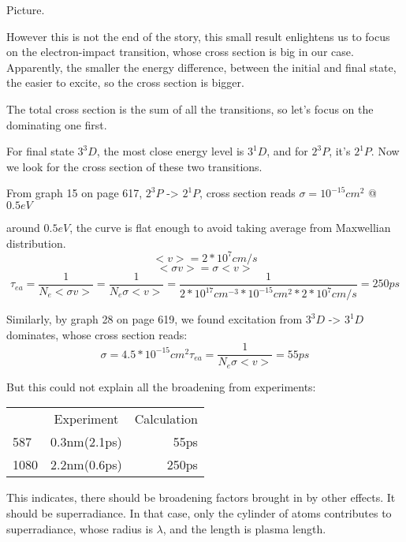 Picture.

However this is not the end of the story, this small result enlightens
us to focus on the electron-impact transition, whose cross section is
big in our case. Apparently, the smaller the energy difference,
between the initial and final state, the easier to excite, so the
cross section is bigger.

The total cross section is the sum of all the transitions, so let's
focus on the dominating one first.

For final state $3^3D$, the most close energy level is $3^1D$, and for
$2^3P$, it's $2^1P$. Now we look for the cross section of these two
transitions.

From graph 15 on page 617, $2^3P$ -> $2^1P$, cross section reads
$\sigma = 10^{-15}cm^2$ @ $0.5eV$

around $0.5eV$, the curve is flat enough to avoid taking average from
Maxwellian distribution.
\begin{equation*}
<v> = 2*10^7 cm/s
\end{equation*}
\begin{equation*}
<\sigma v> = \sigma <v>
\end{equation*}
\begin{equation}
\tau_{ea} = \frac{1}{N_e<\sigma v>} = \frac{1}{N_e \sigma <v>}
=\frac{1}{2*10^{17}cm^{-3}*10^{-15}cm^2*2*10^7cm/s} = 250 ps
\end{equation}

Similarly, by graph 28 on page 619, we found excitation from $3^3D$ ->
$3^1D$ dominates, whose cross section reads:
\begin{equation}
\sigma = 4.5 * 10^{-15} cm^2
\tau_{ea} = \frac{1}{N_e\sigma<v>} = 55ps
\end{equation}

But this could not explain all the broadening from experiments:

\begin{tabular}{ l c r }
       & Experiment & Calculation \\
  587  & 0.3nm(2.1ps) & 55ps \\
  1080 & 2.2nm(0.6ps) & 250ps \\
\end{tabular}

This indicates, there should be broadening factors brought in by other
effects. It should be superradiance. In that case, only the cylinder
of atoms contributes to superradiance, whose radius is $\lambda$, and
the length is plasma length.

